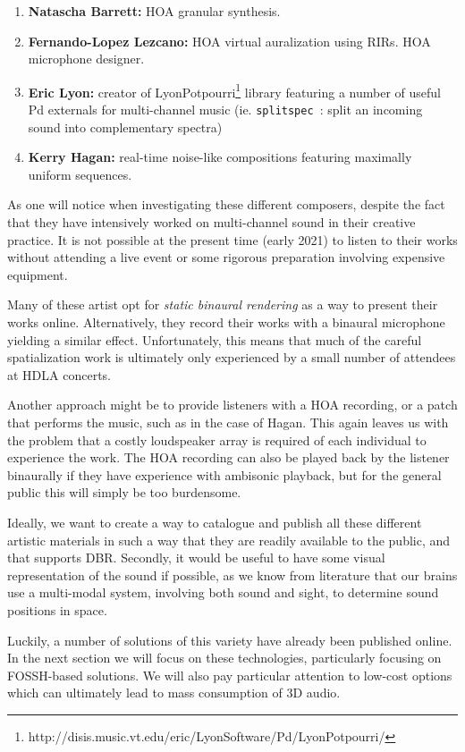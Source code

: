 \begin{enumerate}
    \item \textbf{Natascha Barrett:} HOA granular synthesis.
    \item \textbf{Fernando-Lopez Lezcano:} HOA virtual auralization using RIRs. HOA microphone designer.
    \item \textbf{Eric Lyon:} creator of LyonPotpourri\footnote{http://disis.music.vt.edu/eric/LyonSoftware/Pd/LyonPotpourri/} library featuring a number of useful Pd externals for multi-channel music (ie. \texttt{splitspec~}: split an incoming sound into complementary spectra)
    \item \textbf{Kerry Hagan:} real-time noise-like compositions featuring maximally uniform sequences.
\end{enumerate}

As one will notice when investigating these different composers, despite the fact that they have intensively worked on multi-channel sound in their creative practice. It is not possible at the present time (early 2021) to listen to their works without attending a live event or some rigorous preparation involving expensive equipment. 

Many of these artist opt for \textit{static binaural rendering} as a way to present their works online. Alternatively, they record their works with a binaural microphone yielding a similar effect. Unfortunately, this means that much of the careful spatialization work is ultimately only experienced by a small number of attendees at HDLA concerts.

Another approach might be to provide listeners with a HOA recording, or a patch that performs the music, such as in the case of Hagan. This again leaves us with the problem that a costly loudspeaker array is required of each individual to experience the work. The HOA recording can also be played back by the listener binaurally if they have experience with ambisonic playback, but for the general public this will simply be too burdensome. 

Ideally, we want to create a way to catalogue and publish all these different artistic materials in such a way that they are readily available to the public, and that supports DBR. Secondly, it would be useful to have some visual representation of the sound if possible, as we know from literature that our brains use a multi-modal system, involving both sound and sight, to determine sound positions in space.

Luckily, a number of solutions of this variety have already been published online. In the next section we will focus on these technologies, particularly focusing on FOSSH-based solutions. We will also pay particular attention to low-cost options which can ultimately lead to mass consumption of 3D audio. 

